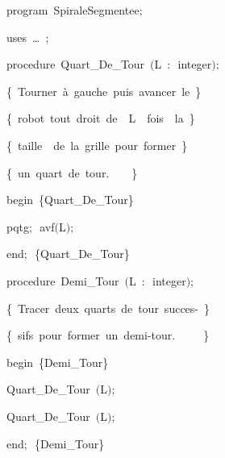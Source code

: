 
{
\parindent {}
\medskip

\carrenoir
\vspace{\neglskip}\mbox{\blc  \idt  \mcl program\idt \ SpiraleSegmentee$;$
}\par 
\vspace{\neglskip}\mbox{\blc \blk\idt \mcl uses\idt \ \ldots\ $;$
}\par 
\medskip

\pagebreak[3] 
\vspace{\neglskip}\mbox{\blc  \blk\idt  \mcl procedure\idt \ Quart\_De\_Tour\ $($L\ $:$\ integer$)$$;$}\par 
\vspace{\neglskip}\mbox{\blc  \blk\blk\idt  \cmt  \{\ Tourner\ à\ gauche\ puis\ avancer\ le\ \}\idt }\par 
\vspace{\neglskip}\mbox{\blc  \blk\blk\idt  \cmt  \{\ robot\ tout\ droit\ de\ \ L\ \ fois\ \ la\ \}\idt }\par 
\vspace{\neglskip}\mbox{\blc  \blk\blk\idt  \cmt  \{\ taille\ \ de\ la\ grille\ pour\ former\ \}\idt }\par 
\vspace{\neglskip}\mbox{\blc  \blk\blk\idt  \cmt  \{\ un\ quart\ de\ tour.\ \ \ \ \}\idt }\par 
\vspace{\neglskip}\mbox{\blc  \blk\idt  \mcl begin\idt \ \cmt  \{Quart\_De\_Tour\}\idt }\par 
\vspace{\neglskip}\mbox{\blc  \blk\blk\idt  pqtg$;$\ avf$($L$)$$;$}\par 
\vspace{\neglskip}\mbox{\blc  \blk\idt  \mcl end\idt $;$\ \cmt  \{Quart\_De\_Tour\}\idt }\par 
\medskip

\pagebreak[3] 
\vspace{\neglskip}\mbox{\blc  \blk\idt  \mcl procedure\idt \ Demi\_Tour\ $($L\ $:$\ integer$)$$;$}\par 
\vspace{\neglskip}\mbox{\blc  \blk\blk\idt  \cmt  \{\ Tracer\ deux\ quarts\ de\ tour\ succes-\ \}\idt }\par 
\vspace{\neglskip}\mbox{\blc  \blk\blk\idt  \cmt  \{\ sifs\ pour\ former\ un\ demi-tour.\ \ \ \ \ \}\idt }\par 
\vspace{\neglskip}\mbox{\blc  \blk\idt  \mcl begin\idt \ \cmt  \{Demi\_Tour\}\idt }\par 
\vspace{\neglskip}\mbox{\blc  \blk\blk\blk\idt  Quart\_De\_Tour\ $($L$)$$;$}\par 
\vspace{\neglskip}\mbox{\blc  \blk\blk\blk\idt  Quart\_De\_Tour\ $($L$)$$;$}\par 
\vspace{\neglskip}\mbox{\blc  \blk\idt  \mcl end\idt $;$\ \cmt  \{Demi\_Tour\}\idt }\par 
\medskip

}
